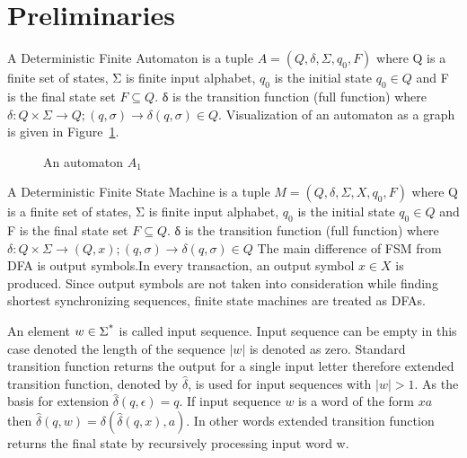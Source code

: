 \documentclass[12pt]{article}
\begin{document}
\section{Preliminaries}
\par A Deterministic Finite Automaton is a tuple $A = (Q,\delta, \Sigma, q_{0}, F)$ where Q is a finite set of states, Σ is finite input alphabet,  $q_{0}$ is the initial state $ q_{0} \in Q $ and F is the final state set $F \subseteq Q $. δ
is the transition function (full function) where $\delta: Q \times \Sigma \rightarrow Q ; (q,\sigma) \rightarrow \delta (q,\sigma) \in Q  $. Visualization of an automaton as a graph is given in Figure~\ref{fig:A0}. 

\begin{figure}[ht]
	\centering
	\begin{minipage}{.5\textwidth}
		\centering
{}
\caption{An automaton $A_1$}\label{fig:A0}
\end{minipage}
\end{figure}
\par A Deterministic Finite State Machine is a tuple $M = (Q,\delta, \Sigma, X, q_{0}, F)$ where Q is a finite set of states, Σ is finite input alphabet,  $q_{0}$ is the initial state $ q_{0} \in Q $ and F is the final state set $F \subseteq Q $. δ
is the transition function (full function) where $\delta: Q \times \Sigma \rightarrow (Q, x) ; (q,\sigma) \rightarrow \delta (q,\sigma) \in Q  $ The main difference of FSM from DFA is output symbols.In every transaction, an output symbol $x \in X$ is produced. Since output symbols are not taken into consideration while finding shortest synchronizing sequences, finite state machines are treated as DFAs.

\par An element $w \in \Sigma \textsuperscript{*}$ is called input sequence. Input sequence can be empty in this case denoted the length of the sequence $|w|$ is denoted as zero. Standard transition function returns the output for a single input letter therefore extended transition function, denoted by $\hat{\delta}$, is used for input sequences with $|w| > 1$. As the basis for extension  $\hat{\delta} (q, \epsilon) = q$. If input sequence $w$ is a word of the form $xa$ then $\hat{\delta} (q, w) = \delta(\hat{\delta}(q, x), a)$. In other words extended transition function returns the final state by recursively processing input word w.
\end{document}
